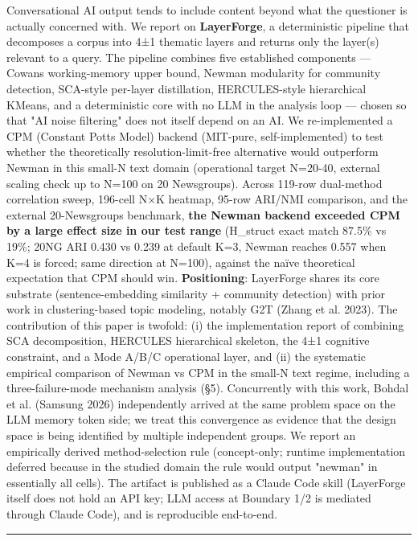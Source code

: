 \documentclass[
]{article}
\begin{document}
Conversational AI output tends to include content beyond what the
questioner is actually concerned with. We report on \textbf{LayerForge},
a deterministic pipeline that decomposes a corpus into 4±1 thematic
layers and returns only the layer(s) relevant to a query. The pipeline
combines five established components --- Cowan\textquotesingle s
working-memory upper bound, Newman modularity for community detection,
SCA-style per-layer distillation, HERCULES-style hierarchical KMeans,
and a deterministic core with no LLM in the analysis loop --- chosen so
that "AI noise filtering" does not itself depend on an AI. We
re-implemented a CPM (Constant Potts Model) backend (MIT-pure,
self-implemented) to test whether the theoretically
resolution-limit-free alternative would outperform Newman in this
small-N text domain (operational target N=20-40, external scaling check
up to N=100 on 20 Newsgroups). Across 119-row dual-method correlation
sweep, 196-cell N×K heatmap, 95-row ARI/NMI comparison, and the external
20-Newsgroups benchmark, \textbf{the Newman backend exceeded CPM by a
large effect size in our test range} (H\_struct exact match 87.5\% vs
19\%; 20NG ARI 0.430 vs 0.239 at default K=3, Newman reaches 0.557 when
K=4 is forced; same direction at N=100), against the naïve theoretical
expectation that CPM should win. \textbf{Positioning}: LayerForge shares
its core substrate (sentence-embedding similarity + community detection)
with prior work in clustering-based topic modeling, notably G2T (Zhang
et al. 2023). The contribution of this paper is twofold: (i) the
implementation report of combining SCA decomposition, HERCULES
hierarchical skeleton, the 4±1 cognitive constraint, and a Mode A/B/C
operational layer, and (ii) the systematic empirical comparison of
Newman vs CPM in the small-N text regime, including a three-failure-mode
mechanism analysis (§5). Concurrently with this work, Bohdal et al.
(Samsung 2026) independently arrived at the same problem space on the
LLM memory token side; we treat this convergence as evidence that the
design space is being identified by multiple independent groups. We
report an empirically derived method-selection rule (concept-only;
runtime implementation deferred because in the studied domain the rule
would output "newman" in essentially all cells). The artifact is
published as a Claude Code skill (LayerForge itself does not hold an API
key; LLM access at Boundary 1/2 is mediated through Claude Code), and is
reproducible end-to-end.

\begin{center}\rule{0.5\linewidth}{0.5pt}\end{center}
\end{document}
